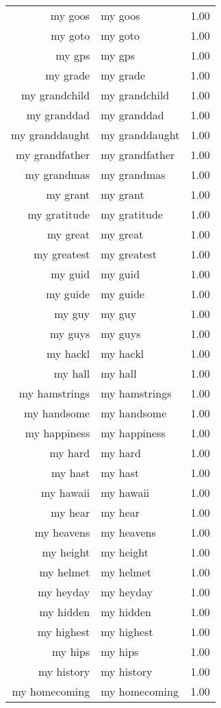 \begin{table}[ht]
\begin{tabular}{rlr}
  my goos & my goos & 1.00 \\ 
  my goto & my goto & 1.00 \\ 
  my gps & my gps & 1.00 \\ 
  my grade & my grade & 1.00 \\ 
  my grandchild & my grandchild & 1.00 \\ 
  my granddad & my granddad & 1.00 \\ 
  my granddaught & my granddaught & 1.00 \\ 
  my grandfather & my grandfather & 1.00 \\ 
  my grandmas & my grandmas & 1.00 \\ 
  my grant & my grant & 1.00 \\ 
  my gratitude & my gratitude & 1.00 \\ 
  my great & my great & 1.00 \\ 
  my greatest & my greatest & 1.00 \\ 
  my guid & my guid & 1.00 \\ 
  my guide & my guide & 1.00 \\ 
  my guy & my guy & 1.00 \\ 
  my guys & my guys & 1.00 \\ 
  my hackl & my hackl & 1.00 \\ 
  my hall & my hall & 1.00 \\ 
  my hamstrings & my hamstrings & 1.00 \\ 
  my handsome & my handsome & 1.00 \\ 
  my happiness & my happiness & 1.00 \\ 
  my hard & my hard & 1.00 \\ 
  my hast & my hast & 1.00 \\ 
  my hawaii & my hawaii & 1.00 \\ 
  my hear & my hear & 1.00 \\ 
  my heavens & my heavens & 1.00 \\ 
  my height & my height & 1.00 \\ 
  my helmet & my helmet & 1.00 \\ 
  my heyday & my heyday & 1.00 \\ 
  my hidden & my hidden & 1.00 \\ 
  my highest & my highest & 1.00 \\ 
  my hips & my hips & 1.00 \\ 
  my history & my history & 1.00 \\ 
  my homecoming & my homecoming & 1.00 \\ 

\end{tabular}
\end{table}
